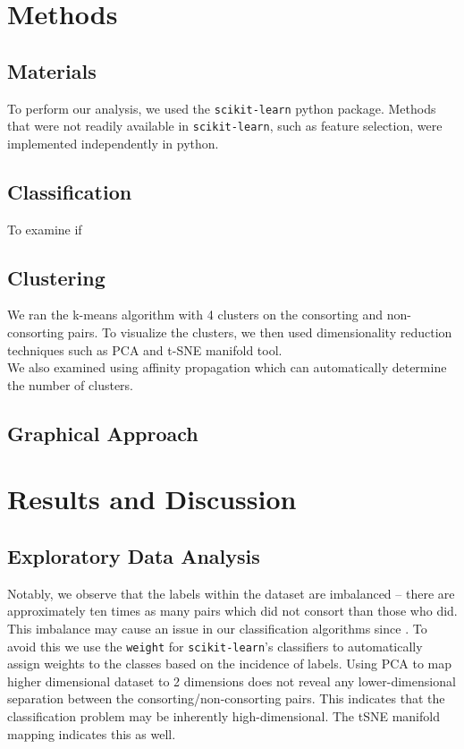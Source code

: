 \documentclass[twoside,twocolumn,paper=letter]{article}
\begin{document}
\section{Methods}
\subsection{Materials}

To perform our analysis, we used the \texttt{scikit-learn} python package. Methods
that were not readily available in \texttt{scikit-learn}, such as feature selection, were
implemented independently in python.


\subsection{Classification}
To examine if 
\subsection{Clustering}

We ran the k-means algorithm with 4 clusters on the consorting and
non-consorting pairs. To visualize the clusters, we then used dimensionality
reduction techniques such as PCA and t-SNE manifold tool.\\

We also examined using affinity propagation which can automatically determine
the number of clusters.

\subsection{Graphical Approach}


\section{Results and Discussion}
\subsection{Exploratory Data Analysis}
Notably, we observe that the labels within the dataset are imbalanced -- there
are approximately ten times as many pairs which did not consort than those who
did. This imbalance may cause an issue in our classification algorithms since .
To avoid this we use the \texttt{weight} for \texttt{scikit-learn}'s classifiers
to automatically assign weights to the classes based on the incidence of labels.
Using PCA to map higher dimensional dataset to 2 dimensions does not reveal
any lower-dimensional separation between the consorting/non-consorting pairs.
This indicates that the classification problem may be inherently
high-dimensional. The tSNE manifold mapping indicates this as well.
\end{document}
